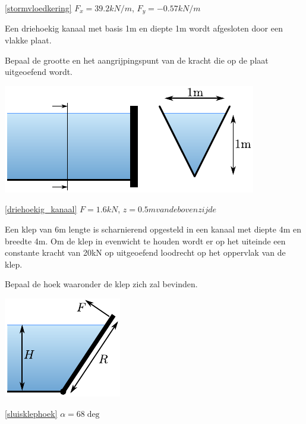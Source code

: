 	\begin{antwoord}{\ref{stormvloedkering}}
		$F_x = 39.2\unit{kN/m}$, $F_y = -0.57\unit{kN/m}$
	\end{antwoord}
	\begin{toepassing}
		\label{driehoekig_kanaal}
Een driehoekig kanaal met basis 1m en diepte 1m wordt afgesloten door een vlakke plaat.
		
Bepaal de grootte en het aangrijpingspunt van de kracht die op de plaat uitgeoefend wordt.

\centering
\includegraphics{fig/hydrostatica/driehoekig_kanaal}
	\end{toepassing}
	\begin{antwoord}{\ref{driehoekig_kanaal}}
		$F = 1.6\unit{kN}$, $z=0.5\unit{m} van de bovenzijde$
	\end{antwoord}
	\begin{toepassing}
		\label{sluisklephoek}
Een klep van 6m lengte is scharnierend opgesteld in een kanaal met diepte 4m en breedte 4m. Om de klep in evenwicht te houden wordt er op het uiteinde een constante kracht van 20kN op uitgeoefend loodrecht op het oppervlak van de klep.
		
Bepaal de hoek waaronder de klep zich zal bevinden.

\centering
\includegraphics{fig/hydrostatica/sluisklephoek}
	\end{toepassing}
	\begin{antwoord}{\ref{sluisklephoek}}
		$\alpha = 68\deg$ 
	\end{antwoord}	
